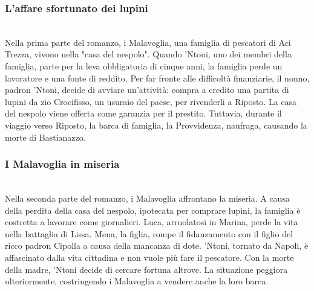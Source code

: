 \documentclass{report}
\begin{document}
\subsubsection{L'affare sfortunato dei lupini}
\\
Nella prima parte del romanzo, i Malavoglia, una famiglia di pescatori di Aci Trezza, vivono nella "casa del nespolo". Quando ’Ntoni, uno dei membri della famiglia, parte per la leva obbligatoria di cinque anni, la famiglia perde un lavoratore e una fonte di reddito. Per far fronte alle difficoltà finanziarie, il nonno, padron ’Ntoni, decide di avviare un'attività: compra a credito una partita di lupini da zio Crocifisso, un usuraio del paese, per rivenderli a Riposto. La casa del nespolo viene offerta come garanzia per il prestito. Tuttavia, durante il viaggio verso Riposto, la barca di famiglia, la Provvidenza, naufraga, causando la morte di Bastianazzo.
\\
\subsubsection{I Malavoglia in miseria}
\\
Nella seconda parte del romanzo, i Malavoglia affrontano la miseria. A causa della perdita della casa del nespolo, ipotecata per comprare lupini, la famiglia è costretta a lavorare come giornalieri. Luca, arruolatosi in Marina, perde la vita nella battaglia di Lissa. Mena, la figlia, rompe il fidanzamento con il figlio del ricco padron Cipolla a causa della mancanza di dote. ’Ntoni, tornato da Napoli, è affascinato dalla vita cittadina e non vuole più fare il pescatore. Con la morte della madre, ’Ntoni decide di cercare fortuna altrove. La situazione peggiora ulteriormente, costringendo i Malavoglia a vendere anche la loro barca.
\\
\end{document}
